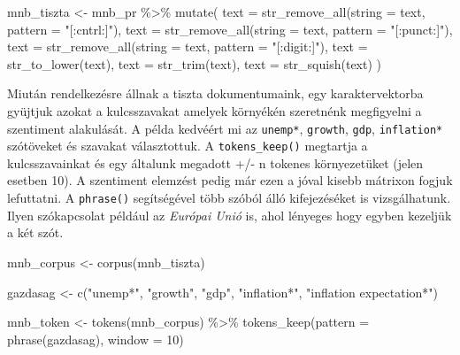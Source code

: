 \documentclass[
]{book}
\newenvironment{Shaded}{\begin{snugshade}}{\end{snugshade}}
\newcommand{\AttributeTok}[1]{\textcolor[rgb]{0.77,0.63,0.00}{#1}}
\newcommand{\DecValTok}[1]{\textcolor[rgb]{0.00,0.00,0.81}{#1}}
\newcommand{\FunctionTok}[1]{\textcolor[rgb]{0.00,0.00,0.00}{#1}}
\newcommand{\NormalTok}[1]{#1}
\newcommand{\OtherTok}[1]{\textcolor[rgb]{0.56,0.35,0.01}{#1}}
\newcommand{\SpecialCharTok}[1]{\textcolor[rgb]{0.00,0.00,0.00}{#1}}
\newcommand{\StringTok}[1]{\textcolor[rgb]{0.31,0.60,0.02}{#1}}
\begin{document}
\begin{Shaded}
\begin{Highlighting}[]
\NormalTok{mnb\_tiszta }\OtherTok{\textless{}{-}}\NormalTok{ mnb\_pr }\SpecialCharTok{\%\textgreater{}\%}
  \FunctionTok{mutate}\NormalTok{(}
    \AttributeTok{text =} \FunctionTok{str\_remove\_all}\NormalTok{(}\AttributeTok{string =}\NormalTok{ text, }\AttributeTok{pattern =} \StringTok{"[:cntrl:]"}\NormalTok{),}
    \AttributeTok{text =} \FunctionTok{str\_remove\_all}\NormalTok{(}\AttributeTok{string =}\NormalTok{ text, }\AttributeTok{pattern =} \StringTok{"[:punct:]"}\NormalTok{),}
    \AttributeTok{text =} \FunctionTok{str\_remove\_all}\NormalTok{(}\AttributeTok{string =}\NormalTok{ text, }\AttributeTok{pattern =} \StringTok{"[:digit:]"}\NormalTok{),}
    \AttributeTok{text =} \FunctionTok{str\_to\_lower}\NormalTok{(text),}
    \AttributeTok{text =} \FunctionTok{str\_trim}\NormalTok{(text),}
    \AttributeTok{text =} \FunctionTok{str\_squish}\NormalTok{(text)}
\NormalTok{  )}
\end{Highlighting}
\end{Shaded}

Miután rendelkezésre állnak a tiszta dokumentumaink, egy
karaktervektorba gyüjtjuk azokat a kulcsszavakat amelyek környékén
szeretnénk megfigyelni a szentiment alakulását. A példa kedvéért mi az
\texttt{unemp*}, \texttt{growth}, \texttt{gdp}, \texttt{inflation*}
szótöveket és szavakat választottuk. A \texttt{tokens\_keep()} megtartja
a kulcsszavainkat és egy általunk megadott +/- n tokenes környezetüket
(jelen esetben 10). A szentiment elemzést pedig már ezen a jóval kisebb
mátrixon fogjuk lefuttatni. A \texttt{phrase()} segítségével több szóból
álló kifejezéséket is vizsgálhatunk. Ilyen szókapcsolat például az
\emph{Európai Unió} is, ahol lényeges hogy egyben kezeljük a két szót.

\begin{Shaded}
\begin{Highlighting}[]
\NormalTok{mnb\_corpus }\OtherTok{\textless{}{-}} \FunctionTok{corpus}\NormalTok{(mnb\_tiszta)}

\NormalTok{gazdasag }\OtherTok{\textless{}{-}} \FunctionTok{c}\NormalTok{(}\StringTok{"unemp*"}\NormalTok{, }\StringTok{"growth"}\NormalTok{, }\StringTok{"gdp"}\NormalTok{, }\StringTok{"inflation*"}\NormalTok{, }\StringTok{"inflation expectation*"}\NormalTok{)}

\NormalTok{mnb\_token }\OtherTok{\textless{}{-}} \FunctionTok{tokens}\NormalTok{(mnb\_corpus) }\SpecialCharTok{\%\textgreater{}\%}
  \FunctionTok{tokens\_keep}\NormalTok{(}\AttributeTok{pattern =} \FunctionTok{phrase}\NormalTok{(gazdasag), }\AttributeTok{window =} \DecValTok{10}\NormalTok{)}
\end{Highlighting}
\end{Shaded}
\end{document}
